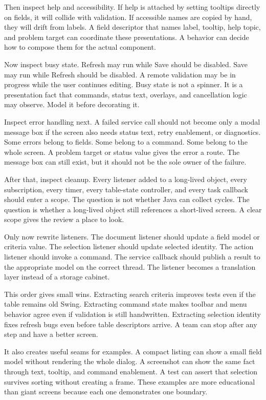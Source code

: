 Then inspect help and accessibility. If help is attached by setting tooltips directly on fields, it will collide with validation. If accessible names are copied by hand, they will drift from labels. A field descriptor that names label, tooltip, help topic, and problem target can coordinate these presentations. A behavior can decide how to compose them for the actual component.

Now inspect busy state. Refresh may run while Save should be disabled. Save may run while Refresh should be disabled. A remote validation may be in progress while the user continues editing. Busy state is not a spinner. It is a presentation fact that commands, status text, overlays, and cancellation logic may observe. Model it before decorating it.

Inspect error handling next. A failed service call should not become only a modal message box if the screen also needs status text, retry enablement, or diagnostics. Some errors belong to fields. Some belong to a command. Some belong to the whole screen. A problem target or status value gives the error a route. The message box can still exist, but it should not be the sole owner of the failure.

After that, inspect cleanup. Every listener added to a long-lived object, every subscription, every timer, every table-state controller, and every task callback should enter a scope. The question is not whether Java can collect cycles. The question is whether a long-lived object still references a short-lived screen. A clear scope gives the review a place to look.

Only now rewrite listeners. The document listener should update a field model or criteria value. The selection listener should update selected identity. The action listener should invoke a command. The service callback should publish a result to the appropriate model on the correct thread. The listener becomes a translation layer instead of a storage cabinet.

This order gives small wins. Extracting search criteria improves tests even if the table remains old Swing. Extracting command state makes toolbar and menu behavior agree even if validation is still handwritten. Extracting selection identity fixes refresh bugs even before table descriptors arrive. A team can stop after any step and have a better screen.

It also creates useful seams for examples. A compact listing can show a small field model without rendering the whole dialog. A screenshot can show the same fact through text, tooltip, and command enablement. A test can assert that selection survives sorting without creating a frame. These examples are more educational than giant screens because each one demonstrates one boundary.

